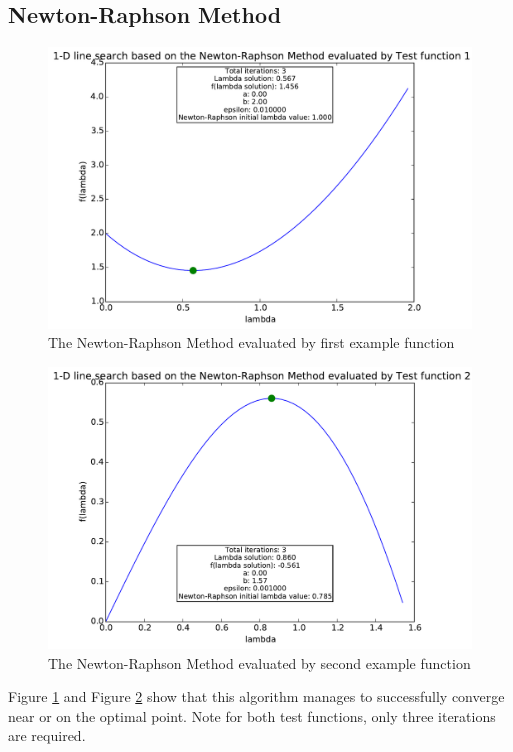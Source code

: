 \documentclass[a4paper,10pt]{article}
\begin{document}
\subsection{Newton-Raphson Method}
\begin{figure}[h]
\centering
 \includegraphics[scale=0.55]{./graphs/algorithm1/x_in_middel/testFunction1.pdf} 
 \caption{The Newton-Raphson Method evaluated by first example function}
 \label{fig:alg1test1}
\end{figure}

\begin{figure}[h]
\centering
 \includegraphics[scale=0.55]{./graphs/algorithm1/x_in_middel/testFunction2.pdf} 
 \caption{The Newton-Raphson Method evaluated by second example function}
 \label{fig:alg1test2}
\end{figure}

Figure \ref{fig:alg1test1} and Figure \ref{fig:alg1test2} show that this algorithm manages to successfully converge near or on the optimal point. Note for both test functions, only three iterations are required.
\end{document}
